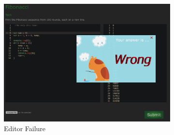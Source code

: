 \documentclass[a4paper]{article}
\begin{document}
\begin{figure}[h!]
\begin{subfigure}[b]{0.3\linewidth}
    \includegraphics[width=\linewidth]{images/editor-failure.png}
    \caption{Editor Failure}
    \label{fig:editor_failure}
  \end{subfigure}
  \caption{}
\end{figure}
\end{document}
